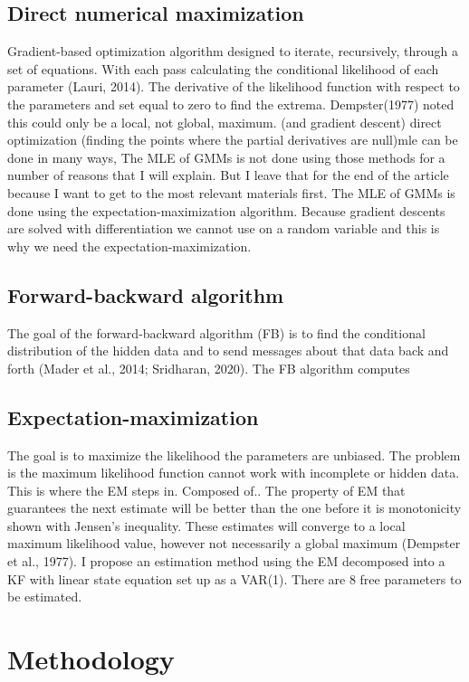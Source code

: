 \documentclass[12pt, letterpaper]{article}
\begin{document}
	\subsection{Direct numerical maximization}
		Gradient-based optimization algorithm designed to iterate, recursively, through a set of equations. With each pass calculating the conditional likelihood of each parameter (Lauri, 2014). The derivative of the likelihood function with respect to the parameters and set equal to zero to find the extrema. Dempster(1977) noted this could only be a local, not global, maximum. (and gradient descent) direct optimization (finding the points where the partial derivatives are null)mle can be done in many ways, The MLE of GMMs is not done using those methods for a number of reasons that I will explain. But I leave that for the end of the article because I want to get to the most relevant materials first. The MLE of GMMs is done using the expectation-maximization algorithm. Because gradient descents are solved with differentiation we cannot use on a random variable and this is why we need the expectation-maximization.
	
	
	\subsection{Forward-backward algorithm}
	The goal of the forward-backward algorithm (FB) is to find the conditional distribution of the hidden data and to send messages about that data back and forth (Mader et al., 2014; Sridharan, 2020). The FB algorithm computes 
	
	\subsection{Expectation-maximization}
	The goal is to maximize the likelihood the parameters are unbiased. The problem is the maximum likelihood function cannot work with incomplete or hidden data.  This is where the EM steps in.
	Composed of..
	The property of EM that guarantees the next estimate will be better than the one before it is monotonicity shown with Jensen’s inequality. These estimates will converge to a local maximum likelihood value, however not necessarily a global maximum (Dempster et al., 1977). 
	I propose  an estimation method using the EM decomposed into a KF with linear state equation set up as a VAR(1). There are 8 free parameters to be estimated.  



	\section{Methodology}
\end{document}
